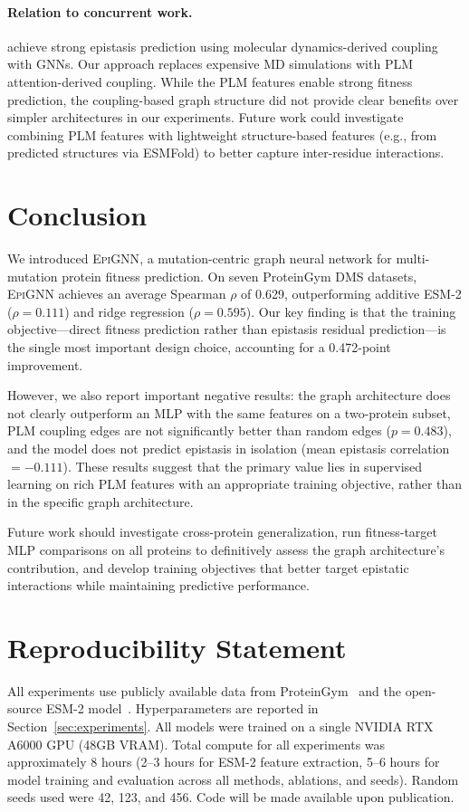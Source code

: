 \documentclass{article}
\newcommand{\epignn}{\textsc{EpiGNN}}
\begin{document}
\paragraph{Relation to concurrent work.}
\citet{huynh2025dynamics} achieve strong epistasis prediction using molecular dynamics-derived coupling with GNNs.
Our approach replaces expensive MD simulations with PLM attention-derived coupling.
While the PLM features enable strong fitness prediction, the coupling-based graph structure did not provide clear benefits over simpler architectures in our experiments.
Future work could investigate combining PLM features with lightweight structure-based features (e.g., from predicted structures via ESMFold) to better capture inter-residue interactions.

\section{Conclusion}
\label{sec:conclusion}

We introduced \epignn{}, a mutation-centric graph neural network for multi-mutation protein fitness prediction.
On seven ProteinGym DMS datasets, \epignn{} achieves an average Spearman $\rho$ of 0.629, outperforming additive ESM-2 ($\rho = 0.111$) and ridge regression ($\rho = 0.595$).
Our key finding is that the training objective---direct fitness prediction rather than epistasis residual prediction---is the single most important design choice, accounting for a 0.472-point improvement.

However, we also report important negative results: the graph architecture does not clearly outperform an MLP with the same features on a two-protein subset, PLM coupling edges are not significantly better than random edges ($p = 0.483$), and the model does not predict epistasis in isolation (mean epistasis correlation $= -0.111$).
These results suggest that the primary value lies in supervised learning on rich PLM features with an appropriate training objective, rather than in the specific graph architecture.

Future work should investigate cross-protein generalization, run fitness-target MLP comparisons on all proteins to definitively assess the graph architecture's contribution, and develop training objectives that better target epistatic interactions while maintaining predictive performance.

\section*{Reproducibility Statement}

All experiments use publicly available data from ProteinGym~\citep{notin2023proteingym} and the open-source ESM-2 model~\citep{lin2023evolutionary}.
Hyperparameters are reported in Section~\ref{sec:experiments}.
All models were trained on a single NVIDIA RTX A6000 GPU (48GB VRAM).
Total compute for all experiments was approximately 8 hours (2--3 hours for ESM-2 feature extraction, 5--6 hours for model training and evaluation across all methods, ablations, and seeds).
Random seeds used were 42, 123, and 456.
Code will be made available upon publication.



\end{document}
